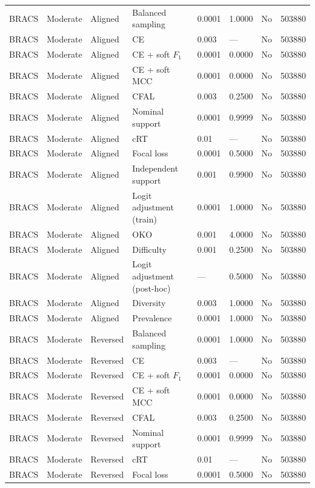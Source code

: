 \begin{longtable}{lllllllr}
BRACS & Moderate & Aligned & Balanced sampling & 0.0001 & 1.0000 & No & 503880 \\
BRACS & Moderate & Aligned & CE & 0.003 & --- & No & 503880 \\
BRACS & Moderate & Aligned & CE + soft $F_1$ & 0.0001 & 0.0000 & No & 503880 \\
BRACS & Moderate & Aligned & CE + soft MCC & 0.0001 & 0.0000 & No & 503880 \\
BRACS & Moderate & Aligned & CFAL & 0.003 & 0.2500 & No & 503880 \\
BRACS & Moderate & Aligned & Nominal support & 0.0001 & 0.9999 & No & 503880 \\
BRACS & Moderate & Aligned & cRT & 0.01 & --- & No & 503880 \\
BRACS & Moderate & Aligned & Focal loss & 0.0001 & 0.5000 & No & 503880 \\
BRACS & Moderate & Aligned & Independent support & 0.001 & 0.9900 & No & 503880 \\
BRACS & Moderate & Aligned & Logit adjustment (train) & 0.0001 & 1.0000 & No & 503880 \\
BRACS & Moderate & Aligned & OKO & 0.001 & 4.0000 & No & 503880 \\
BRACS & Moderate & Aligned & Difficulty & 0.001 & 0.2500 & No & 503880 \\
BRACS & Moderate & Aligned & Logit adjustment (post-hoc) & --- & 0.5000 & No & 503880 \\
BRACS & Moderate & Aligned & Diversity & 0.003 & 1.0000 & No & 503880 \\
BRACS & Moderate & Aligned & Prevalence & 0.0001 & 1.0000 & No & 503880 \\
BRACS & Moderate & Reversed & Balanced sampling & 0.0001 & 1.0000 & No & 503880 \\
BRACS & Moderate & Reversed & CE & 0.003 & --- & No & 503880 \\
BRACS & Moderate & Reversed & CE + soft $F_1$ & 0.0001 & 0.0000 & No & 503880 \\
BRACS & Moderate & Reversed & CE + soft MCC & 0.0001 & 0.0000 & No & 503880 \\
BRACS & Moderate & Reversed & CFAL & 0.003 & 0.2500 & No & 503880 \\
BRACS & Moderate & Reversed & Nominal support & 0.0001 & 0.9999 & No & 503880 \\
BRACS & Moderate & Reversed & cRT & 0.01 & --- & No & 503880 \\
BRACS & Moderate & Reversed & Focal loss & 0.0001 & 0.5000 & No & 503880 \\

\end{longtable}
